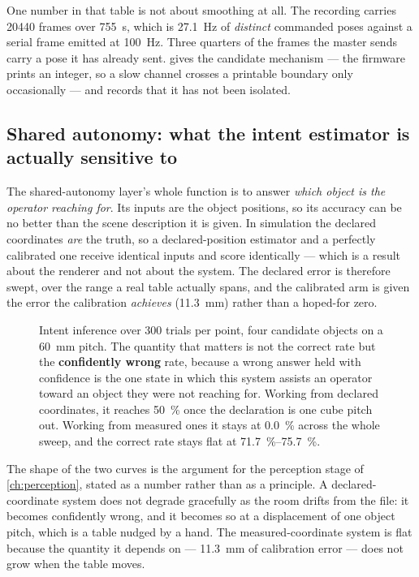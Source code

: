 One number in that table is not about smoothing at all. The recording carries
\num{20440} frames over \SI{755}{\second}, which is \SI{27.1}{\hertz} of
\emph{distinct} commanded poses against a serial frame emitted at
\SI{100}{\hertz}. Three quarters of the frames the master sends carry a pose
it has already sent.  gives the candidate mechanism --- the
firmware prints an integer, so a slow channel crosses a printable boundary
only occasionally --- and records that it has not been isolated.

\subsection{Shared autonomy: what the intent estimator is actually sensitive to}
\label{sec:sim-shared}

The shared-autonomy layer's whole function is to answer \emph{which object is
the operator reaching for}. Its inputs are the object positions, so its
accuracy can be no better than the scene description it is given. In
simulation the declared coordinates \emph{are} the truth, so a
declared-position estimator and a perfectly calibrated one receive identical
inputs and score identically --- which is a result about the renderer and not
about the system. The declared error is therefore swept, over the range a
real table actually spans, and the calibrated arm is given the error the
calibration \emph{achieves} (\SI{11.3}{\milli\metre}) rather than a hoped-for
zero.

\begin{figure}[htbp]
  \centering
  
  \caption[Intent inference against a mis-declared table]{Intent inference
  over \num{300} trials per point, four candidate objects on a
  \SI{60}{\milli\metre} pitch. The quantity that matters is not the correct
  rate but the \textbf{confidently wrong} rate, because a wrong answer held
  with confidence is the one state in which this system assists an operator
  toward an object they were not reaching for. Working from declared
  coordinates, it reaches \SI{50}{\percent} once the declaration is one cube
  pitch out. Working from measured ones it stays at \SI{0.0}{\percent}
  across the whole sweep, and the correct rate stays flat at
  \SIrange{71.7}{75.7}{\percent}.}
  \label{fig:sim-autonomy}
\end{figure}

The shape of the two curves is the argument for the perception stage of
\cref{ch:perception}, stated as a number rather than as a principle. A
declared-coordinate system does not degrade gracefully as the room drifts
from the file: it becomes confidently wrong, and it becomes so at a
displacement of one object pitch, which is a table nudged by a hand. The
measured-coordinate system is flat because the quantity it depends on ---
\SI{11.3}{\milli\metre} of calibration error --- does not grow when the table
moves.

